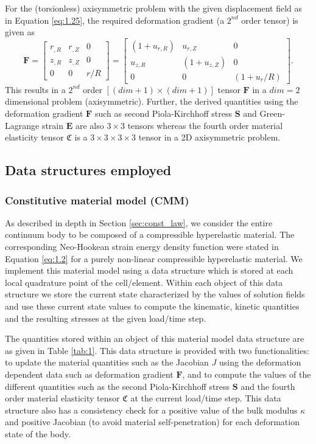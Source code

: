 \documentclass[11pt,a4paper,final]{article}
\begin{document}
For the (torsionless) axisymmetric problem with the given displacement field as in Equation \eqref{eq:1.25}, the required deformation gradient (a $2^{nd}$ order tensor) is given as \cite{Zienkiewicz2013}
\begin{equation}
\mathbf{F} = \begin{bmatrix}
r_{, R} & r_{, Z} & 0 \\
z_{, R} & z_{, Z} & 0 \\
0 & 0 & r/R
\end{bmatrix} = \begin{bmatrix}
(1 + u_{r, R}) & u_{r, Z} & 0 \\
u_{z, R} & (1 + u_{z, Z}) & 0 \\
0 & 0 & (1 + u_r / R)
\end{bmatrix}.
\label{eq:1.26}
\end{equation}
This results in a $2^{nd}$ order $[(dim + 1) \times (dim + 1)]$ tensor $\mathbf{F}$ in a $dim = 2$ dimensional problem (axisymmetric).  Further, the derived quantities using the deformation gradient $\mathbf{F}$ such as second Piola-Kirchhoff stress $\mathbf{S}$ and Green-Lagrange strain $\mathbf{E}$ are also $3 \times 3$ tensors whereas the fourth order material elasticity tensor $\mathfrak{C}$ is a $3 \times 3 \times 3 \times 3$ tensor in a 2D axisymmetric problem.

\subsection{Data structures employed}
\subsubsection{Constitutive material model (CMM)}
As described in depth in Section \eqref{sec:const_law}, we consider the entire continuum body to be composed of a compressible hyperelastic material. The corresponding Neo-Hookean strain energy density function were stated in Equation \eqref{eq:1.2} for a purely non-linear compressible hyperelastic material. We implement this material model using a data structure which is stored at each local quadrature point of the cell/element. Within each object of this data structure we store the current state characterized by the values of solution fields and use these current state values to compute the kinematic, kinetic quantities and the resulting stresses at the given load/time step.\par 
The quantities stored within an object of this material model data structure are as given in Table \eqref{tab:1}. This data structure is provided with two functionalities: to update the material quantities such as the Jacobian $J$ using the deformation dependent data such as deformation gradient $\mathbf{F}$, and to compute the values of the different quantities such as the second Piola-Kirchhoff stress $\mathbf{S}$ and the fourth order material elasticity tensor $\mathfrak{C}$ at the current load/time step. This data structure also has a consistency check for a positive value of the bulk modulus $\kappa$ and positive Jacobian (to avoid material self-penetration) for each deformation state of the body. \par 
\end{document}
